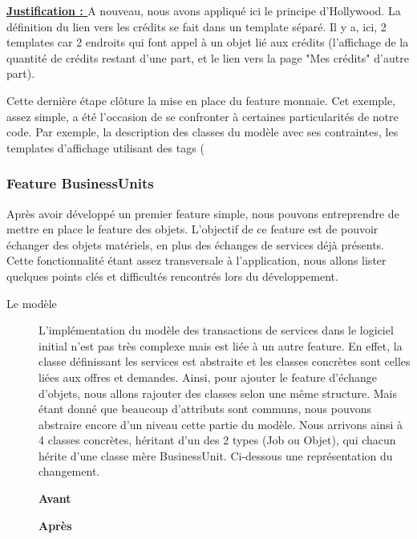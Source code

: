 \textbf{\underline{Justification : }} A nouveau,  nous avons appliqué ici le principe d'Hollywood.  La définition du lien vers les crédits se fait dans un template séparé.  Il y a,  ici,  2 templates car 2 endroits qui font appel à un objet lié aux crédits (l'affichage de la quantité de crédits restant d'une part,  et le lien vers la page "Mes crédits" d'autre part).

Cette dernière étape clôture la mise en place du feature monnaie.  Cet exemple,  assez simple,  a été l'occasion de se confronter à certaines particularités de notre code.  Par exemple,  la description des classes du modèle avec ses contraintes,  les templates d'affichage utilisant des tags ( {%

\subsubsection{Feature BusinessUnits}

Après avoir développé un premier feature simple,  nous pouvons entreprendre de mettre en place le feature des objets.  L'objectif de ce feature est de pouvoir échanger des objets matériels,  en plus des échanges de services déjà présents.  Cette fonctionnalité étant assez transversale à l'application,  nous allons lister quelques points clés et difficultés rencontrés lors du développement.  

\begin{description}
\item[Le modèle]
L'implémentation du modèle des transactions de services dans le logiciel initial n'est pas très complexe mais est liée à un autre feature.  En effet,  la classe définissant les services est abstraite et les classes concrètes sont celles liées aux offres et demandes.  Ainsi,  pour ajouter le feature d'échange  d'objets,  nous allons rajouter des classes selon une même structure.  Mais étant donné que beaucoup d'attributs sont communs,  nous pouvons abstraire encore d'un niveau cette partie du modèle.  Nous arrivons ainsi à 4 classes concrètes,  héritant d'un des 2 types (Job ou Objet),  qui chacun hérite d'une classe mère BusinessUnit.  Ci-dessous une représentation du changement.


\begin{minipage}{.5\textwidth}
\begin{center} \textbf{Avant}\end{center}
\vspace{0.3cm}
\begin{center}
\end{center}
\end{minipage}
\hspace{0.3cm}
\begin{minipage}{.5\textwidth}
\begin{center} \textbf{Après}\end{center}
\end{minipage}
\vspace{0.3cm}


\end{description}}
